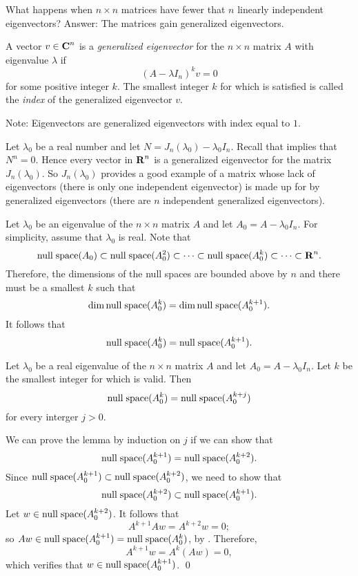 What happens when $n\times n$ matrices have fewer that $n$ linearly 
independent eigenvectors?  Answer: The matrices gain generalized 
eigenvectors.

\begin{Def}
A vector $v\in\mbox{$\bf{C}$}^n$ is a {\em generalized eigenvector\/} for the 
$n\times n$ matrix $A$ with eigenvalue $\lambda$ if
\begin{equation}  \label{e:geneig}
(A-\lambda I_n)^kv = 0
\end{equation}
for some positive integer $k$. The smallest integer $k$ for which
 is satisfied is called the {\em index\/}
 of the generalized eigenvector $v$.
\end{Def}  
Note: Eigenvectors are generalized eigenvectors with
index equal to $1$.

Let $\lambda_0$ be a real number and let $N=J_n(\lambda_0)-\lambda_0 I_n$.  
Recall that  implies that $N^n=0$.  Hence every vector in $\mbox{$\bf{R}$}^n$ 
is a generalized eigenvector for the matrix $J_n(\lambda_0)$.  So 
$J_n(\lambda_0)$ provides a good example of a matrix whose lack of 
eigenvectors (there is only one independent eigenvector) is made up for by 
generalized eigenvectors (there are $n$ independent generalized eigenvectors).

Let $\lambda_0$ be an eigenvalue of the $n\times n$ matrix $A$ and let 
$A_0 = A-\lambda_0 I_n$.  For simplicity, assume that $\lambda_0$ is real.
Note that 
\[
{\rm null\;space}(A_0)\subset{\rm null\;space}(A_0^2)\subset\cdots\subset{\rm null\;space}(A_0^k)\subset\cdots
\subset\mbox{$\bf{R}$}^n.
\]
Therefore, the dimensions of the null spaces are bounded above by $n$ and
there must be a smallest $k$ such that 
\[
\dim{\rm null\;space}(A_0^k)=\dim{\rm null\;space}(A_0^{k+1}).
\]
It follows that 
\begin{equation}  \label{E:nullsequal}
{\rm null\;space}(A_0^k)={\rm null\;space}(A_0^{k+1}).
\end{equation}
\begin{lemma}  \label{L:Jordan}
Let $\lambda_0$ be a real eigenvalue of the $n\times n$ matrix $A$ and let 
$A_0 = A-\lambda_0 I_n$.  Let $k$ be the smallest integer for which 
 is valid.  Then 
\[
{\rm null\;space}(A_0^k)={\rm null\;space}(A_0^{k+j})
\]
for every interger $j>0$.
\end{lemma}

\proof We can prove the lemma by induction on $j$ if we can show that 
\[
{\rm null\;space}(A_0^{k+1})={\rm null\;space}(A_0^{k+2}).
\]
Since ${\rm null\;space}(A_0^{k+1})\subset{\rm null\;space}(A_0^{k+2})$, we need to show that
\[
{\rm null\;space}(A_0^{k+2})\subset{\rm null\;space}(A_0^{k+1}).
\]
Let $w\in{\rm null\;space}(A_0^{k+2})$.  It follows that 
\[
A^{k+1}Aw = A^{k+2}w = 0;
\]
so $Aw\in{\rm null\;space}(A_0^{k+1})={\rm null\;space}(A_0^k)$, by .  Therefore,
\[
A^{k+1}w = A^k(Aw) = 0,
\]
which verifies that $w\in{\rm null\;space}(A_0^{k+1})$.  \qed

